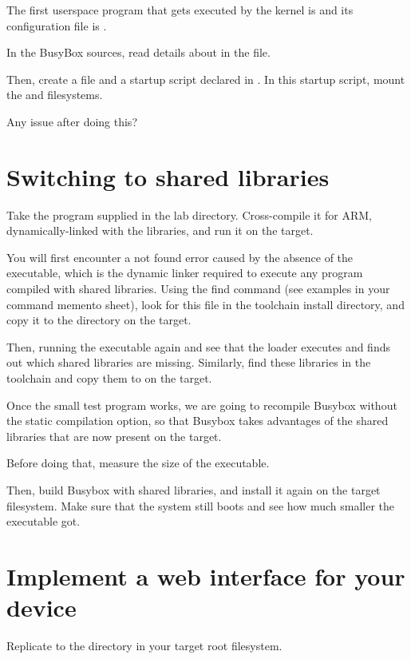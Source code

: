 The first userspace program that gets executed by the kernel is
 and its configuration file is .

In the BusyBox sources, read details about  in the
 file.

Then, create a  file and a 
startup script declared in . In this startup
script, mount the  and  filesystems.

Any issue after doing this?

\section{Switching to shared libraries}

Take the  program supplied in the lab 
directory. Cross-compile it for ARM, dynamically-linked with the
libraries, and run it on the target.

You will first encounter a not found error caused by the absence of
the  executable, which is the dynamic linker
required to execute any program compiled with shared libraries. Using
the find command (see examples in your command memento sheet), look
for this file in the toolchain install directory, and copy it to the
 directory on the target.

Then, running the executable again and see that the loader executes
and finds out which shared libraries are missing. Similarly, find
these libraries in the toolchain and copy them to  on the
target.

Once the small test program works, we are going to recompile Busybox
without the static compilation option, so that Busybox takes advantages of the
shared libraries that are now present on the target.

Before doing that, measure the size of the  executable.

Then, build Busybox with shared libraries, and install it again on the
target filesystem. Make sure that the system still boots and see
how much smaller the  executable got.


\section{Implement a web interface for your device}

Replicate  to the  directory in your target root filesystem.

